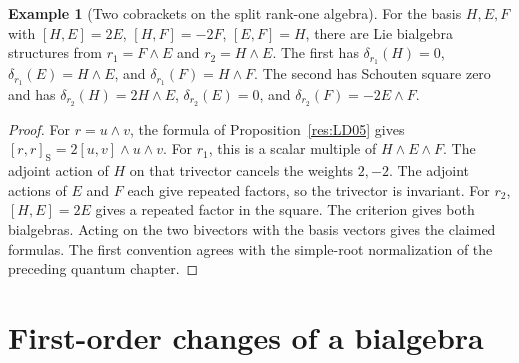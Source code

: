 \documentclass[11pt,oneside,openany]{book}
\theoremstyle{definition}
\newtheorem{example}[theorem]{Example}
\theoremstyle{remark}
\begin{document}
\begin{example}[Two cobrackets on the split rank-one algebra]
\label{res:LD06}
For the basis \(H,E,F\) with \([H,E]=2E\),
\([H,F]=-2F\), \([E,F]=H\), there are Lie bialgebra
structures from \(r_1=F\wedge E\) and \(r_2=H\wedge E\).
The first has
\(\delta_{r_1}(H)=0\), \(\delta_{r_1}(E)=H\wedge E\),
and \(\delta_{r_1}(F)=H\wedge F\).
The second has Schouten square zero and has
\(\delta_{r_2}(H)=2H\wedge E\), \(\delta_{r_2}(E)=0\),
and \(\delta_{r_2}(F)=-2E\wedge F\).
\end{example}
\begin{proof}
For \(r=u\wedge v\), the formula of
Proposition~\ref{res:LD05} gives
\([r,r]_{\mathrm S}=2[u,v]\wedge u\wedge v\).
For \(r_1\), this is a scalar multiple of \(H\wedge E\wedge F\).
The adjoint action of \(H\) on that trivector cancels the
weights \(2,-2\). The adjoint actions of \(E\) and \(F\)
each give repeated factors, so the trivector is invariant.
For \(r_2\), \([H,E]=2E\) gives a repeated factor in the square.
The criterion gives both bialgebras. Acting on the two
bivectors with the basis vectors gives the claimed formulas.
The first convention agrees with the simple-root normalization
of the preceding quantum chapter.
\end{proof}

\section{First-order changes of a bialgebra}
\end{document}
